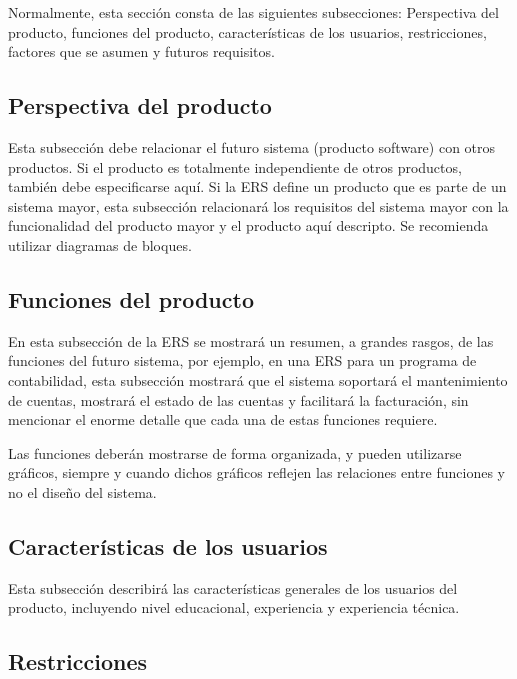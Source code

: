 \documentclass[12pt,a4paper, twosite]{book}
\begin{document}
Normalmente, esta sección consta de las siguientes subsecciones:
Perspectiva del producto, funciones del producto, características de
los usuarios, restricciones, factores que se asumen y futuros
requisitos.


\subsection{Perspectiva del producto}
\label{sec:org24980a8}

Esta subsección debe relacionar el futuro sistema (producto
software) con otros productos. Si el producto es totalmente
independiente de otros productos, también debe especificarse
aquí. Si la ERS define un producto que es parte de un sistema mayor,
esta subsección relacionará los requisitos del sistema mayor con la
funcionalidad del producto mayor y el producto aquí descripto. Se
recomienda utilizar diagramas de bloques.


\subsection{Funciones del producto}
\label{sec:orgaf51da6}

En esta subsección de la ERS se mostrará un resumen, a grandes
rasgos, de las funciones del futuro sistema, por ejemplo, en una ERS
para un programa de contabilidad, esta subsección mostrará que el
sistema soportará el mantenimiento de cuentas, mostrará el estado de
las cuentas y facilitará la facturación, sin mencionar el enorme
detalle que cada una de estas funciones requiere.

Las funciones deberán mostrarse de forma organizada, y pueden
utilizarse gráficos, siempre y cuando dichos gráficos reflejen las
relaciones entre funciones y no el diseño del sistema.


\subsection{Características de los usuarios}
\label{sec:orga40b0ee}

Esta subsección describirá las características generales de los
usuarios del producto, incluyendo nivel educacional, experiencia y
experiencia técnica.


\subsection{Restricciones}
\label{sec:org5ca5790}
\end{document}
